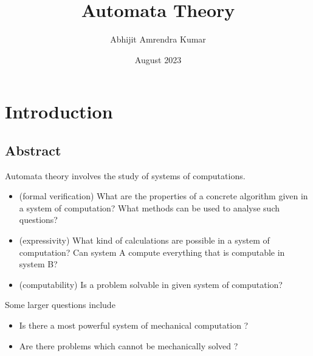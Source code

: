 \documentclass{report}
\title{Automata Theory}
\author{Abhijit Amrendra Kumar}
\date{August 2023}
\begin{document}
\maketitle

\chapter{Introduction}
\section{Abstract}

Automata theory involves the study of systems of computations.
\begin{itemize}[leftmargin=0.2in]
  \item (formal verification) What are the properties of a concrete algorithm given in a system of computation? What methods can be used to analyse such questions?
  \item (expressivity) What kind of calculations are possible in a system of computation? Can system A compute everything that is computable in system B?
  \item (computability) Is a problem solvable in given system of computation?
\end{itemize}

Some larger questions include
\begin{itemize}[leftmargin=0.2in]
  \item Is there a most powerful system of mechanical computation ?
  \item Are there problems which cannot be mechanically solved ?
\end{itemize}
\end{document}
